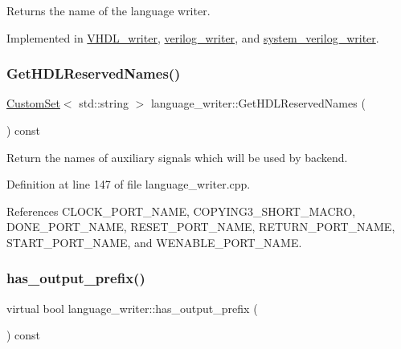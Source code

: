 Returns the name of the language writer. 



Implemented in \hyperlink{structVHDL__writer_a1bf07f430f6ea252ea65286d2b2b5ded}{V\+H\+D\+L\+\_\+writer}, \hyperlink{classverilog__writer_a59b2afa9a031c6fff601b4f349dd434b}{verilog\+\_\+writer}, and \hyperlink{classsystem__verilog__writer_a176f5235f5fd8ec5a0c84f85382475e3}{system\+\_\+verilog\+\_\+writer}.

\mbox{\label{classlanguage__writer_a814d52423ed277edd092423a51a40a69}} 
\subsubsection{\texorpdfstring{Get\+H\+D\+L\+Reserved\+Names()}{GetHDLReservedNames()}}
{\footnotesize\ttfamily \hyperlink{custom__set_8hpp_a615bc2f42fc38a4bb1790d12c759e86f}{Custom\+Set}$<$ std\+::string $>$ language\+\_\+writer\+::\+Get\+H\+D\+L\+Reserved\+Names (\begin{DoxyParamCaption}{ }\end{DoxyParamCaption}) const}



Return the names of auxiliary signals which will be used by backend. 



Definition at line 147 of file language\+\_\+writer.\+cpp.



References C\+L\+O\+C\+K\+\_\+\+P\+O\+R\+T\+\_\+\+N\+A\+ME, C\+O\+P\+Y\+I\+N\+G3\+\_\+\+S\+H\+O\+R\+T\+\_\+\+M\+A\+C\+RO, D\+O\+N\+E\+\_\+\+P\+O\+R\+T\+\_\+\+N\+A\+ME, R\+E\+S\+E\+T\+\_\+\+P\+O\+R\+T\+\_\+\+N\+A\+ME, R\+E\+T\+U\+R\+N\+\_\+\+P\+O\+R\+T\+\_\+\+N\+A\+ME, S\+T\+A\+R\+T\+\_\+\+P\+O\+R\+T\+\_\+\+N\+A\+ME, and W\+E\+N\+A\+B\+L\+E\+\_\+\+P\+O\+R\+T\+\_\+\+N\+A\+ME.

\mbox{\label{classlanguage__writer_a10d8bf3a0f71364bc3a72273c1172a34}} 
\subsubsection{\texorpdfstring{has\+\_\+output\+\_\+prefix()}{has\_output\_prefix()}}
{\footnotesize\ttfamily virtual bool language\+\_\+writer\+::has\+\_\+output\+\_\+prefix (\begin{DoxyParamCaption}{ }\end{DoxyParamCaption}) const\hspace{0.3cm}{\ttfamily [pure virtual]}}



